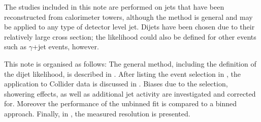 The studies included in this note are performed on jets that have been reconstructed from calorimeter towers, although the method is general and may be applied to any type of detector level jet.
Dijets have been chosen due to their relatively large cross section; the likelihood could also be defined for other events such as $\gamma$+jet events, however.

This note is organised as follows:
The general method, including the definition of the dijet likelihood, is described in .
After listing the event selection in , the application to Collider data is discussed in .
Biases due to the selection, showering effects, as well as additional jet activity are investigated and corrected for.
Moreover the performance of the unbinned fit is compared to a binned approach.
Finally, in , the measured resolution is presented.
